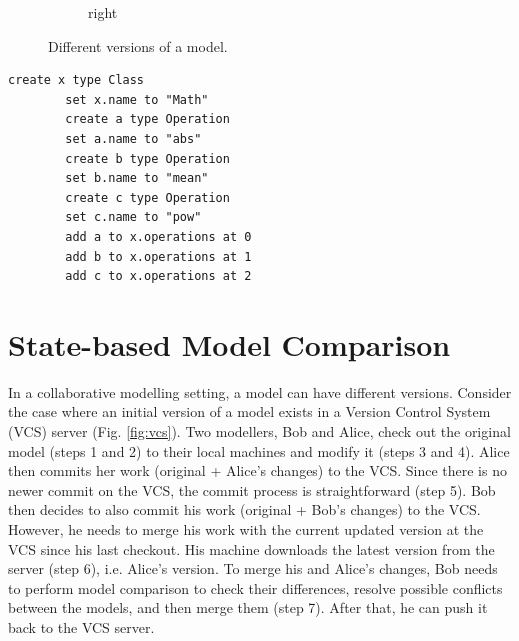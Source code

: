 \documentclass{jot}
\newcommand{\dk}[1]{\textcolor{blue}{\textbf{[Dimitris: #1]}}}
\begin{document}
\begin{minipage}[t]{0.61\linewidth}
\begin{figure}[H]
\begin{subfigure}[t]{0.2\linewidth}
                \caption{right}
                \label{fig:right}
            \end{subfigure}
            \hfill
            \label{fig:versions}
            \caption{Different versions of a model.}
        \end{figure}
    \end{minipage}
    \hfill
    \begin{minipage}[t]{0.37\linewidth}
        \begin{lstlisting}[style=eol,numbersep=0.6pt,caption={The pseudo-formatted CBP of the model in Fig. \ref{fig:origin}.},label=lst:origincbp]
        create x type Class
        set x.name to "Math" 
        create a type Operation
        set a.name to "abs" 
        create b type Operation
        set b.name to "mean" 
        create c type Operation
        set c.name to "pow" 
        add a to x.operations at 0
        add b to x.operations at 1
        add c to x.operations at 2
        \end{lstlisting}
    \end{minipage}
    
    \vspace{-5pt}
    \section{State-based Model Comparison}
    \label{sec:model_comparison}
    
    \vspace{-5pt}
    In a collaborative modelling setting, a model can have different versions.
    Consider the case where an initial version of a model exists in a Version Control System (VCS) server (Fig. \ref{fig:vcs}).
    Two modellers, Bob and Alice, check out the original model (steps 1 and 2) to their local machines and modify it (steps 3 and 4).
    Alice then commits her work (original + Alice's changes) to the VCS.
    Since there is no newer commit on the VCS, the commit process is straightforward (step 5).
    Bob then decides to also commit his work (original + Bob's changes) to the VCS.
    However, he needs to merge his work with the current updated version at the VCS since his last checkout.
    His machine downloads the latest version from the server (step 6), i.e. Alice's version.
    To merge his and Alice's changes, Bob needs to perform model comparison to check their differences, resolve possible conflicts between the models, and then merge them (step 7).
    After that, he can push it back to the VCS server.
    
\end{document}
